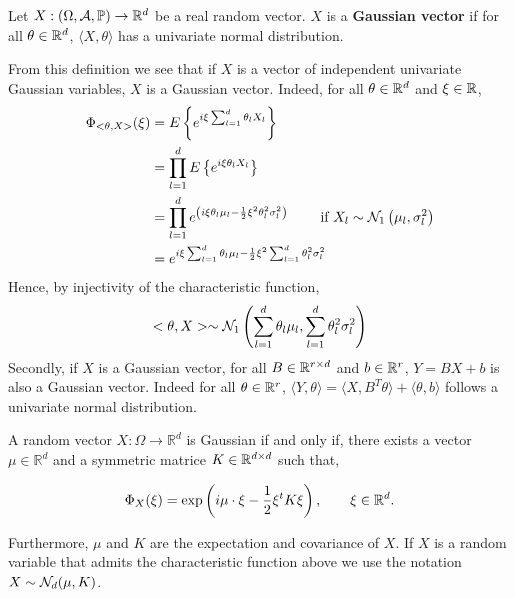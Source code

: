 \documentclass{article}
\begin{document}
\begin{definition}
  Let $X:(\Omega,\mathcal{A},\mathbb{P}) \to \mathbb{R}^{d}$ be a real random vector. $X$ is a \textbf{Gaussian
    vector} if for all $\theta \in \mathbb{R}^{d}$, $\langle X, \theta \rangle$ has a
  univariate normal distribution.
\end{definition}
From this definition we see that if $X$ is a vector of independent univariate
Gaussian variables, $X$ is a Gaussian vector. Indeed, for all $\theta \in \mathbb{R}^{d}$
and $\xi \in \mathbb{R}$, 
$$
\begin{aligned}
  \Phi_{<\theta, X>}(\xi ) &=E\left\{e^{i \xi \sum_{l=1}^{d} \theta_{l} X_{l}}\right\} \\
  &=\prod_{l=1}^{d} E\left\{e^{i \xi \theta_{l} X_{l}}\right\} \\
  &=\prod_{l=1}^{d} e^{\left(i \xi \theta_{l} \mu_{l}-\frac{1}{2} \xi^{2} \theta_{l}^{2}
      \sigma_{l}^{2}\right)} \qquad \text { if } X_{l} \sim
  \mathcal{N}_{1}\left(\mu_{l}, \sigma_{l}^2 \right) \\
  &=e^{i \xi \sum_{l=1}^{d} \theta_{l} \mu_{l}-\frac{1}{2} \xi^{2} \sum_{l=1}^{d} \theta_{l}^{2} \sigma_{l}^{2}}
\end{aligned}
$$
Hence, by injectivity of the characteristic function,
$$
<\theta, X>\sim \mathcal{N}_{1}\left(\sum_{l=1}^d \theta_{l} \mu_{l}, \sum_{l=1}^d \theta_{l}^{2} \sigma_{l}^{2}\right)
$$
Secondly, if $X$ is a Gaussian vector, for all $B \in \mathbb{R}^{r \times d}$ and $b
\in \mathbb{R}^r$, $Y = BX + b$ is also a Gaussian vector. Indeed for all $\theta \in
\mathbb{R}^r$, $\langle Y,\theta \rangle = \langle X,B^T\theta \rangle + \langle
\theta,b \rangle$ follows a univariate normal distribution.

\begin{theorem} A random vector $X: \Omega \rightarrow \mathbb{R}^{d}$ is
  Gaussian if and only if, there exists a vector $\mu \in \mathbb{R}^{d}$ and a
  symmetric matrice $K \in \mathbb{R}^{d \times d}$ such that, 
  
  \begin{equation} \label{eq:th}
    \Phi_{X}(\xi)=\exp \left(i \mu \cdot \xi-\frac{1}{2} \xi^t K \xi\right),
    \qquad \xi \in \mathbb{R}^{d}.
  \end{equation}
  
  Furthermore, $\mu$ and $K$ are the expectation and covariance of $X$. If $X$
  is a random variable that admits the characteristic function above we use the
  notation $X \sim \mathcal{N}_d(\mu,K)$. 
\end{theorem}
\end{document}
